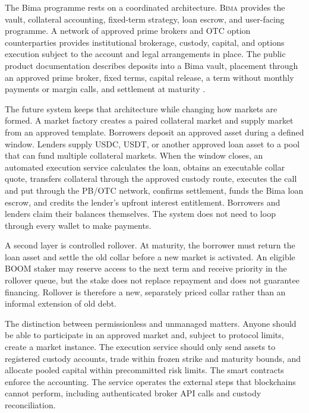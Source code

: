 \documentclass[11pt,oneside]{article}
\newcommand{\Bima}{\textsc{Bima}}
\newcommand{\BOOM}{\textsf{BOOM}}
\begin{document}
The Bima programme rests on a coordinated architecture. \Bima{} provides the vault, collateral accounting, fixed-term strategy, loan escrow, and user-facing programme. A network of approved prime brokers and OTC option counterparties provides institutional brokerage, custody, capital, and options execution subject to the account and legal arrangements in place. The public product documentation describes deposits into a Bima vault, placement through an approved prime broker, fixed terms, capital release, a term without monthly payments or margin calls, and settlement at maturity \cite{bima-docs}.

The future system keeps that architecture while changing how markets are formed. A market factory creates a paired collateral market and supply market from an approved template. Borrowers deposit an approved asset during a defined window. Lenders supply USDC, USDT, or another approved loan asset to a pool that can fund multiple collateral markets. When the window closes, an automated execution service calculates the loan, obtains an executable collar quote, transfers collateral through the approved custody route, executes the call and put through the PB/OTC network, confirms settlement, funds the Bima loan escrow, and credits the lender's upfront interest entitlement. Borrowers and lenders claim their balances themselves. The system does not need to loop through every wallet to make payments.

A second layer is controlled rollover. At maturity, the borrower must return the loan asset and settle the old collar before a new market is activated. An eligible \BOOM{} staker may reserve access to the next term and receive priority in the rollover queue, but the stake does not replace repayment and does not guarantee financing. Rollover is therefore a new, separately priced collar rather than an informal extension of old debt.

The distinction between permissionless and unmanaged matters. Anyone should be able to participate in an approved market and, subject to protocol limits, create a market instance. The execution service should only send assets to registered custody accounts, trade within frozen strike and maturity bounds, and allocate pooled capital within precommitted risk limits. The smart contracts enforce the accounting. The service operates the external steps that blockchains cannot perform, including authenticated broker API calls and custody reconciliation.
\end{document}
